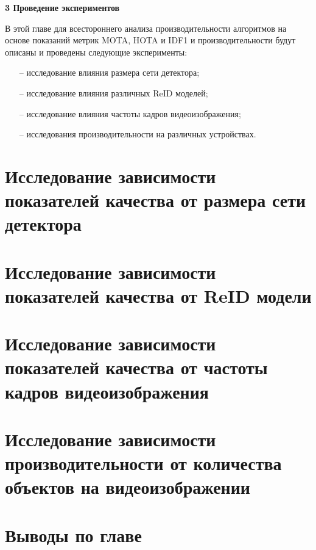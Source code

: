 \newpage
\begin{flushleft}
  \textbf{\large 3 Проведение экспериментов}
\end{flushleft}
В этой главе для всестороннего анализа производительности алгоритмов на основе показаний метрик MOTA, HOTA и IDF1 и производительности будут описаны и проведены следующие эксперименты:
\begin{itemize}
  \item[--] исследование влияния размера сети детектора;
  \item[--] исследование влияния различных ReID моделей;
  \item[--] исследование влияния частоты кадров видеоизображения;
  \item[--] исследования производительности на различных устройствах.
\end{itemize}


\section{Исследование зависимости показателей качества от размера сети детектора}



\section{Исследование зависимости показателей качества от ReID модели}


\section{Исследование зависимости показателей качества от частоты кадров видеоизображения}


\section{Исследование зависимости производительности от количества объектов на видеоизображении}


\section{Выводы по главе}
